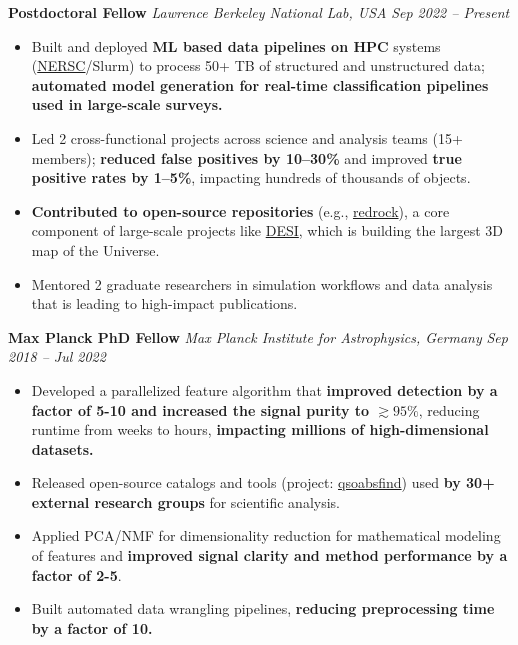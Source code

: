 \documentclass[a4paper,10pt]{article}
\begin{document}
\textcolor{sectionblue}{\textbf{Postdoctoral Fellow }} \hfill \textcolor{sectionblue}{\textit{Lawrence Berkeley National Lab, USA}} \hfill \textcolor{sectionblue}{\textit{Sep 2022 – Present}}
\begin{itemize}
    \item Built and deployed \textbf{ML based data pipelines on HPC} systems (\href{https://www.nersc.gov/}{NERSC}/Slurm) to process 50+ TB of structured and unstructured data; \textbf{automated model generation for real-time classification pipelines used in large-scale surveys.}
    \vspace*{-1mm}
    \item Led 2 cross-functional projects across science and analysis teams (15+ members); \textbf{reduced false positives by 10–30\%} and improved \textbf{true positive rates by 1–5\%}, impacting hundreds of thousands of objects.
    \vspace*{-1mm}
     \item \textbf{Contributed to open-source repositories} (e.g., \href{https://github.com/desihub/redrock}{redrock}), a core component of large-scale projects like \href{https://en.wikipedia.org/wiki/Dark_Energy_Spectroscopic_Instrument}{DESI}, which is building the largest 3D map of the Universe.
    \vspace*{-1mm}
    \item Mentored 2 graduate researchers in simulation workflows and data analysis that is leading to high-impact publications.
    
\end{itemize}
    
\vspace{2mm}
\textcolor{sectionblue}{\textbf{Max Planck PhD Fellow}} \hfill \textcolor{sectionblue}{\textit{Max Planck Institute for Astrophysics, Germany}} \hfill \textcolor{sectionblue}{\textit{Sep 2018 – Jul 2022}}

\begin{itemize}

    \item Developed a parallelized feature algorithm that \textbf{improved detection by a factor of 5-10 and increased the signal purity to $\gtrsim 95\%$}, reducing runtime from weeks to hours, \textbf{impacting millions of high-dimensional datasets.}
    \vspace*{-1mm}
    \item Released open-source catalogs and tools (project: \href{https://github.com/abhi0395/qsoabsfind}{qsoabsfind}) used \textbf{by 30+ external research groups} for scientific analysis.
    \vspace*{-1mm}
    \item Applied PCA/NMF for dimensionality reduction for mathematical modeling of features and \textbf{improved signal clarity and method performance by a factor of 2-5}.
    \vspace*{-1mm}
  \item Built automated data wrangling pipelines, \textbf{reducing preprocessing time by a factor of 10.}
    
\end{itemize}
\end{document}
